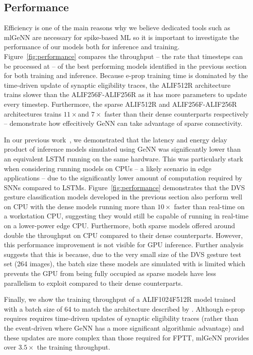 \documentclass[sigconf]{acmart}
\begin{document}
\subsection{Performance}
Efficiency is one of the main reasons why we believe dedicated tools such as mlGeNN are necessary for spike-based ML so it is important to investigate the performance of our models both for inference and training.
Figure~\ref{fig:performance} compares the throughput -- the rate that timesteps can be processed at -- of the best performing models identified in the previous section for both training and inference.
Because e-prop training time is dominated by the time-driven update of synaptic eligibility traces, the ALIF512R architecture trains slower than the ALIF256F-ALIF256R as it has more parameters to update every timestep.
Furthermore, the sparse ALIF512R and ALIF256F-ALIF256R architectures trains $11\times$and $7\times$ faster than their dense counterparts respectively -- demonstrate how effecitively GeNN can take advantage of sparse connectivity.

In our previous work~\citep{Knight2022}, we demonstrated that the latency and energy delay product of inference models simulated using GeNN was significantly lower than an equivalent LSTM running on the same hardware.
This was particularly stark when considering running models on CPUs -- a likely scenario in edge applications -- due to the significantly lower amount of computation required by SNNs compared to LSTMs.
Figure~\ref{fig:performance} demonstrates that the DVS gesture classification models developed in the previous section also perform well on CPU with the dense models running more than $10\times$ faster than real-time on a workstation CPU, suggesting they would still be capable of running in real-time on a lower-power edge CPU.
Furthermore, both sparse models offered around double the throughput on CPU compared to their dense counterparts.
However, this performance improvement is not visible for GPU inference.
Further analysis suggests that this is because, due to the very small size of the DVS gesture test set (\num{264} images), the batch size these models are simulated with is limited which prevents the GPU from being fully occupied as sparse models have less parallelism to exploit compared to their dense counterparts. 

Finally, we show the training throughput of a ALIF1024F512R model trained with a batch size of \num{64} to match the architecture described by \citet{yin2021accurate}.
Although e-prop requires requires time-driven updates of synaptic eligibility traces (rather than the event-driven where GeNN has a more significant algorithmic advantage) and these updates are more complex than those required for FPTT, mlGeNN provides over $3.5\times$ the training throughput.
\end{document}
